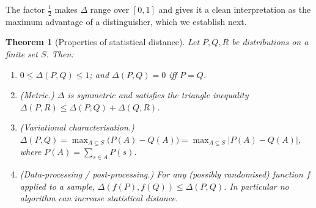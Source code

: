 \documentclass[11pt,a4paper]{article}
\newtheorem{theorem}{Theorem}[section]
\theoremstyle{definition}
\theoremstyle{remark}
\begin{document}
The factor \(\tfrac12\) makes \(\Delta\) range over \([0,1]\) and gives it a clean interpretation as the maximum advantage of a distinguisher, which we establish next.

\begin{theorem}[Properties of statistical distance]\label{probability:thm-sd}
Let \(P, Q, R\) be distributions on a finite set \(S\). Then:
\begin{enumerate}
\item \(0 \le \Delta(P,Q) \le 1\); and \(\Delta(P,Q) = 0\) iff \(P = Q\).
\item \emph{(Metric.)} \(\Delta\) is symmetric and satisfies the triangle inequality \(\Delta(P,R) \le \Delta(P,Q) + \Delta(Q,R)\).
\item \emph{(Variational characterisation.)} \(\displaystyle \Delta(P,Q) = \max_{A \subseteq S}\big(P(A) - Q(A)\big) = \max_{A \subseteq S}\big|P(A) - Q(A)\big|\), where \(P(A) = \sum_{s\in A}P(s)\).
\item \emph{(Data-processing / post-processing.)} For any (possibly randomised) function \(f\) applied to a sample, \(\Delta(f(P), f(Q)) \le \Delta(P, Q)\). In particular no algorithm can increase statistical distance.
\end{enumerate}
\end{theorem}
\end{document}
